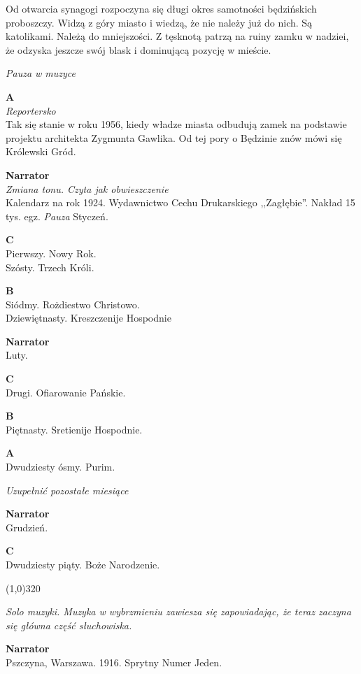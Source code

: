 \documentclass[11pt,a4paper,oneside]{article}
\begin{document}
Od otwarcia synagogi rozpoczyna się długi okres samotności będzińskich
proboszczy. Widzą z góry miasto i wiedzą, że nie należy już do nich.
Są katolikami. Należą do mniejszości. Z tęsknotą patrzą na ruiny zamku w nadziei,
że odzyska jeszcze swój blask i dominującą pozycję w mieście. 

{\color{light-gray} \emph{Pauza w muzyce}}

\textbf{A}\\
{\color{light-gray} \emph{Reportersko}}\\
Tak się stanie w roku 1956, kiedy władze miasta odbudują zamek na podstawie
projektu architekta Zygmunta Gawlika. Od tej pory o Będzinie znów mówi się
Królewski Gród.

\textbf{Narrator}\\
{\color{light-gray} \emph{Zmiana tonu. Czyta jak obwieszczenie}}\\
Kalendarz na rok 1924. Wydawnictwo Cechu Drukarskiego
,,Zagłębie''. Nakład 15 tys. egz. {\color{light-gray} \emph{Pauza}} Styczeń.

\textbf{C}\\
Pierwszy. Nowy Rok. \\
Szósty. Trzech Króli.

\textbf{B}\\
Siódmy. Rożdiestwo Christowo. \\
Dziewiętnasty. Kreszczenije Hospodnie

\textbf{Narrator}\\
Luty.

\textbf{C}\\
Drugi. Ofiarowanie Pańskie.

\textbf{B}\\
Piętnasty. Sretienije Hospodnie.

\textbf{A}\\
Dwudziesty ósmy. Purim.

{\color{red} \emph{Uzupełnić pozostałe miesiące}}

\textbf{Narrator}\\
Grudzień.

\textbf{C}\\
Dwudziesty piąty. Boże Narodzenie.

\line(1,0){320}

{\color{light-gray} \emph{Solo muzyki. Muzyka w wybrzmieniu zawiesza się
zapowiadając, że teraz zaczyna się główna część słuchowiska.}}

\textbf{Narrator}\\
Pszczyna, Warszawa. 1916. Sprytny Numer Jeden. 
\end{document}
